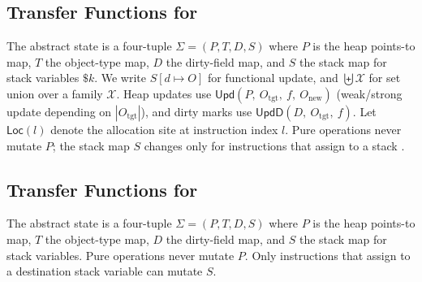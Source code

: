 \subsection{Transfer Functions for \spytecode}
\label{subsec:transfers}

The abstract state is a four-tuple \(\Sigma = (P,T,D,S)\) where \(P\) is the heap
points-to map, \(T\) the object-type map, \(D\) the dirty-field map, and \(S\) the
stack map for stack variables \(\$k\).
We write \(S[d \mapsto O]\) for functional update, and
\(\biguplus\mathcal{X}\) for set union over a family \(\mathcal{X}\).
Heap updates use
\(\mathsf{Upd}(P,\ O_{\mathrm{tgt}},\ f,\ O_{\mathrm{new}})\)
(weak/strong update depending on \(|O_{\mathrm{tgt}}|\)),
and dirty marks use
\(\mathsf{UpdD}(D,\ O_{\mathrm{tgt}},\ f)\).
Let \(\mathsf{Loc}(l)\) denote the allocation site at instruction index \(l\).
Pure operations never mutate \(P\); the stack map \(S\) changes only for
instructions that assign to a stack .
\subsection{Transfer Functions for \spytecode}
\label{subsec:transfers}

The abstract state is a four-tuple \(\Sigma=(P,T,D,S)\) where \(P\) is the heap
points-to map, \(T\) the object-type map, \(D\) the dirty-field map, and \(S\)
the stack map for stack variables.  Pure operations never mutate \(P\).  Only
instructions that assign to a destination stack variable can mutate \(S\).

